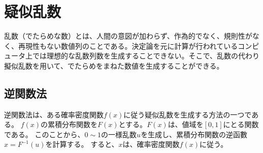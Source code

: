 \section{疑似乱数}
乱数（でたらめな数）とは、人間の意図が加わらず、作為的でなく、規則性がなく、再現性もない数値列のことである。決定論を元に計算が行われているコンピュータ上では理想的な乱数列数を生成することできない。そこで、乱数の代わり擬似乱数を用いて、でたらめをまねた数値を生成することができる。

\subsection{逆関数法}
逆関数法は、ある確率密度関数$f(x)$に従う疑似乱数を生成する方法の一つである。
$f(x)$の累積分布関数を$F(x)$とする。$F(x)$は、値域を$[0,1]$にとる関数である。
このことから、$0\sim 1$の一様乱数$u$を生成し、累積分布関数の逆函數$x=F^{-1}(u)$を計算する。
すると、$x$は、確率密度関数$f(x)$に従う。

